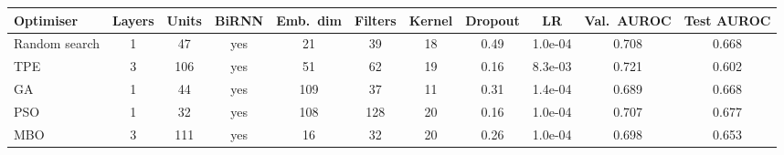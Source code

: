 \begin{tabular}{lcccccccccc}
\toprule
Optimiser & Layers & Units & BiRNN & Emb.\ dim & Filters & Kernel & Dropout & LR & Val.\ AUROC & Test AUROC \\
\midrule
Random search & 1 & 47 & yes & 21 & 39 & 18 & 0.49 & 1.0e-04 & 0.708 & 0.668 \\
TPE & 3 & 106 & yes & 51 & 62 & 19 & 0.16 & 8.3e-03 & 0.721 & 0.602 \\
GA & 1 & 44 & yes & 109 & 37 & 11 & 0.31 & 1.4e-04 & 0.689 & 0.668 \\
PSO & 1 & 32 & yes & 108 & 128 & 20 & 0.16 & 1.0e-04 & 0.707 & 0.677 \\
MBO & 3 & 111 & yes & 16 & 32 & 20 & 0.26 & 1.0e-04 & 0.698 & 0.653 \\
\bottomrule
\end{tabular}